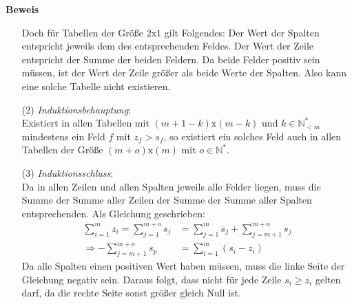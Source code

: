 \documentclass[10pt, a4paper]{amsart}
\makeatletter
\renewcommand\proofname{Beweis}
\renewenvironment{proof}[1][\proofname]{\par
\pushQED{\qed}%
\normalfont \topsep6\p@\@plus6\p@\relax
\trivlist
\item\relax
{\bfseries#1}\hspace\labelsep\ignorespaces
}{%
\popQED\endtrivlist\@endpefalse
}
\makeatother
\begin{document}
\begin{proof}
\begin{itemize}[itemsep=2ex]
    Doch für Tabellen der Größe $2\text{x}1$ gilt Folgendes: Der Wert der
    Spalten entspricht jeweils dem des entsprechenden Feldes. Der Wert der Zeile
    entspricht der Summe der beiden Feldern. Da beide Felder positiv sein
    müssen, ist der Wert der Zeile größer als beide Werte der Spalten. Also
    kann eine solche Tabelle nicht existieren.
  \item[(2)]\emph{Induktionsbehauptung}:\\
    Existiert in allen Tabellen mit $(m+1-k)\text{x}(m-k)$ und $k∈ℕ^*_{<m}$
    mindestens ein Feld $f$ mit $z_f>s_f$, so existiert ein solches Feld auch in
    allen Tabellen der Größe $(m+o)\text{x}(m)$ mit $o∈ℕ^*$.
  \item[(3)]\emph{Induktionsschluss}:\\
    Da in allen Zeilen und allen Spalten jeweils alle Felder liegen, muss die
    Summe der Summe aller Zeilen der Summe der Summe aller Spalten
    entsprechenden. Als Gleichung geschrieben:
    \begin{align*}
      \sum_{i=1}^{m}z_i=\sum_{j=1}^{m+o}s_j&=\sum_{j=1}^{m}s_j+\sum_{j=m+1}^{m+o}s_j\\
      \Rightarrow -\sum_{j=m+1}^{m+o}s_p&= \sum_{i=1}^{m}(s_i-z_i)
    \end{align*}
    Da alle Spalten einen positiven Wert haben müssen, muss die linke Seite der
    Gleichung negativ sein. Daraus folgt, dass nicht für jede Zeile
    $s_i\geq\text{}z_i$ gelten darf, da die rechte Seite sonst größer gleich
    Null ist.
    \begin{figure}[h]
      \centering%
      \def\step{.5cm} \def\col{10} \def\row{8} \def\skip{0.05cm}
      \def\rowskip{\fpeval{\row-3}}
\end{figure}
\end{itemize}
\end{proof}
\end{document}
